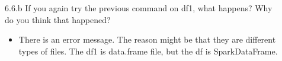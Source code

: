 \documentclass[11pt,a4paper]{article}
\begin{document}
\begin{enumerate}
\begin{description}
	            \item[] 6.6.b If you again try the previous command on df1, what happens? Why do you think that happened?
                  	 \begin{itemize} 
	                       \item There is an error message. The reason might be that they are different types of files. The df1 is data.frame file, but the df is SparkDataFrame.
                     \end{itemize}                     
          \end{description}
          
\end{enumerate}
\end{document}
